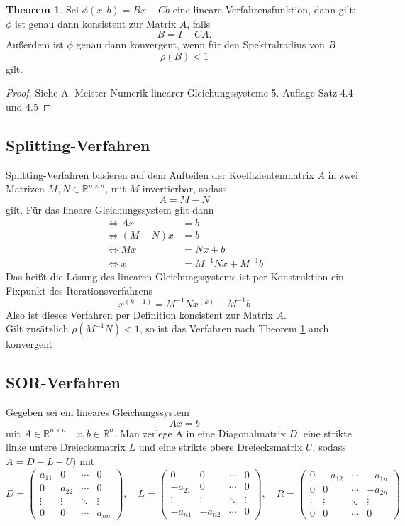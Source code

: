 \documentclass{scrartcl}
\newcommand\R{\mathbb{R}}
\theoremstyle{definition}
\newtheorem{theorem}{Theorem}
\begin{document}
\begin{theorem}
    Sei \(\phi(x,b)=Bx+Cb\) eine lineare Verfahrensfunktion, dann gilt:
    \(\phi\) ist genau dann konsistent zur Matrix \(A\), falls
    \[B=I-CA.\]
    Außerdem ist \(\phi\) genau dann konvergent, wenn für den Spektralradius von \(B\)
    \[\rho(B)<1\]\label{Thrm:Spectralradius}
    gilt.   
\end{theorem}
\begin{proof}
    Siehe A. Meister Numerik linearer Gleichungssysteme 5. Auflage Satz 4.4 und 4.5
\end{proof}
\subsection{Splitting-Verfahren}
Splitting-Verfahren basieren auf dem Aufteilen der Koeffizientenmatrix \(A\) in zwei Matrizen
\(M, N \in \R^{n \times n}\), mit \(M\) invertierbar, sodass 
\[A = M-N\]
gilt.
Für das lineare Gleichungssystem gilt dann
\begin{align*}
        \iff Ax &= b \\
    \iff (M-N)x &= b \\
        \iff Mx &= Nx + b\\
         \iff x &= M^{-1}Nx + M^{-1}b
\end{align*}
Das heißt die Lösung des linearen Gleichungssystems ist per Konstruktion ein Fixpunkt des Iterationsverfahrens 
\[x^{(k+1)}= M^{-1}Nx^{(k)} + M^{-1}b\]
Also ist dieses Verfahren per Definition konsistent zur Matrix \(A\). \\
Gilt zusätzlich \(\rho(M^{-1}N) < 1\), so ist das Verfahren nach Theorem \ref{Thrm:Spectralradius}
auch konvergent


\subsection{SOR-Verfahren}
Gegeben sei ein lineares Gleichungssystem 
\[Ax = b\]
mit \(A \in \mathbb{R}^{n \times n} \quad x,b \in \mathbb{R}^n\).
Man zerlege A in eine Diagonalmatrix \(D\), eine strikte linke untere Dreiecksmatrix 
\(L\) und eine strikte obere Dreiecksmatrix \(U\), sodass
\(A = D -L-U)\) mit
\[
D = \begin{pmatrix}
a_{11} & 0 & \cdots & 0 \\
0 & a_{22} & \cdots & 0 \\
\vdots & \vdots & \ddots & \vdots \\
0 & 0 & \cdots & a_{nn}
\end{pmatrix}, \quad
L = \begin{pmatrix}
0 & 0 & \cdots & 0 \\
-a_{21} & 0 & \cdots & 0 \\
\vdots & \vdots & \ddots & \vdots \\
-a_{n1} & -a_{n2} & \cdots & 0
\end{pmatrix}, \quad
R = \begin{pmatrix}
0 & -a_{12} & \cdots & -a_{1n} \\
0 & 0 & \cdots & -a_{2n} \\
\vdots & \vdots & \ddots & \vdots \\
0 & 0 & \cdots & 0
\end{pmatrix}
\]
\end{document}
